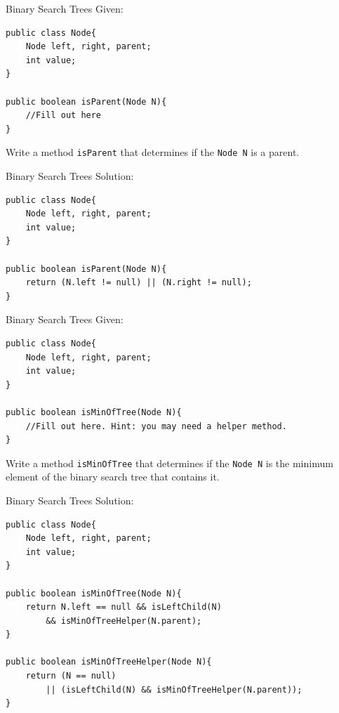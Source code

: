 \documentclass[9pt]{beamer}
\begin{document}
\begin{frame}[fragile]{Binary Search Trees}
Given: \\
 {
  \begin{lstlisting}
public class Node{
    Node left, right, parent;
    int value;
}

public boolean isParent(Node N){
    //Fill out here
}
  \end{lstlisting}
Write a method {\tt isParent} that determines if the {\tt Node N} is a parent.
  }
\end{frame}

\begin{frame}[fragile]{Binary Search Trees}
Solution: \\
 {
  \begin{lstlisting}
public class Node{
    Node left, right, parent;
    int value;
}

public boolean isParent(Node N){
    return (N.left != null) || (N.right != null);
}
  \end{lstlisting}
  }
\end{frame}

\begin{frame}[fragile]{Binary Search Trees}
Given: \\
 {
  \begin{lstlisting}
public class Node{
    Node left, right, parent;
    int value;
}

public boolean isMinOfTree(Node N){
    //Fill out here. Hint: you may need a helper method.
}
  \end{lstlisting}
Write a method {\tt isMinOfTree} that determines if the {\tt Node N} is the minimum element of the binary search tree that contains it. \\
  }
\end{frame}

\begin{frame}[fragile]{Binary Search Trees}
Solution: \\
 { \small
  \begin{lstlisting}
public class Node{
    Node left, right, parent;
    int value;
}

public boolean isMinOfTree(Node N){
    return N.left == null && isLeftChild(N)
        && isMinOfTreeHelper(N.parent);
}

public boolean isMinOfTreeHelper(Node N){
    return (N == null)
        || (isLeftChild(N) && isMinOfTreeHelper(N.parent));
}
  \end{lstlisting}
  }
\end{frame}
\end{document}
